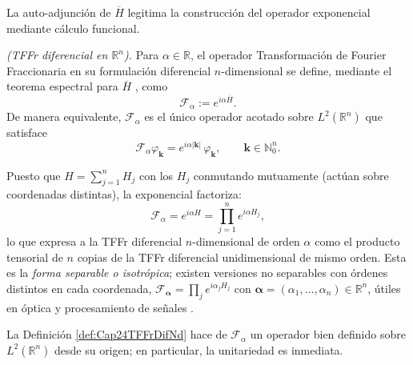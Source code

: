             La auto-adjunción de $\overline{H}$ legitima la construcción del operador exponencial mediante cálculo funcional.

            \begin{definition}\label{def:Cap24TFFrDifNd}
                \textit{(TFFr diferencial en $\mathbb{R}^n$).} Para $\alpha \in \mathbb{R}$, el operador Transformación de Fourier Fraccionaria en su formulación diferencial $n$-dimensional se define, mediante el teorema espectral para $\overline{H}$ \citep[Ch. VIII]{reed1980methods}, como
                \begin{equation}\label{eq:Cap24TFFrDifNd}
                    \mathcal{F}_\alpha := e^{i\alpha \overline{H}}.
                \end{equation}
                De manera equivalente, $\mathcal{F}_\alpha$ es el único operador acotado sobre $L^2(\mathbb{R}^n)$ que satisface
                \begin{equation}\label{eq:Cap24ValPropioNd}
                    \mathcal{F}_\alpha \varphi_{\boldsymbol{k}} = e^{i\alpha |\boldsymbol{k}|}\,\varphi_{\boldsymbol{k}}, \qquad \boldsymbol{k}\in \mathbb{N}_0^n.
                \end{equation}
            \end{definition}

            \begin{remark}\label{rmk:Cap24FactTensor}
                Puesto que $H = \sum_{j=1}^n H_j$ con los $H_j$ conmutando mutuamente (actúan sobre coordenadas distintas), la exponencial factoriza:
                \begin{equation}\label{eq:Cap24FactTensorial}
                    \mathcal{F}_\alpha = e^{i\alpha H} = \prod_{j=1}^n e^{i\alpha H_j},
                \end{equation}
                lo que expresa a la TFFr diferencial $n$-dimensional de orden $\alpha$ como el producto tensorial de $n$ copias de la TFFr diferencial unidimensional de mismo orden. Esta es la \emph{forma separable o isotrópica}; existen versiones no separables con órdenes distintos en cada coordenada, $\mathcal{F}_{\boldsymbol{\alpha}} = \prod_j e^{i\alpha_j H_j}$ con $\boldsymbol{\alpha} = (\alpha_1,\dots,\alpha_n)\in\mathbb{R}^n$, útiles en óptica y procesamiento de señales \citep{ozaktas2001fractional,zayed2018two}.
            \end{remark}


            La Definición \ref{def:Cap24TFFrDifNd} hace de $\mathcal{F}_\alpha$ un operador bien definido sobre $L^2(\mathbb{R}^n)$ desde su origen; en particular, la unitariedad es inmediata.

